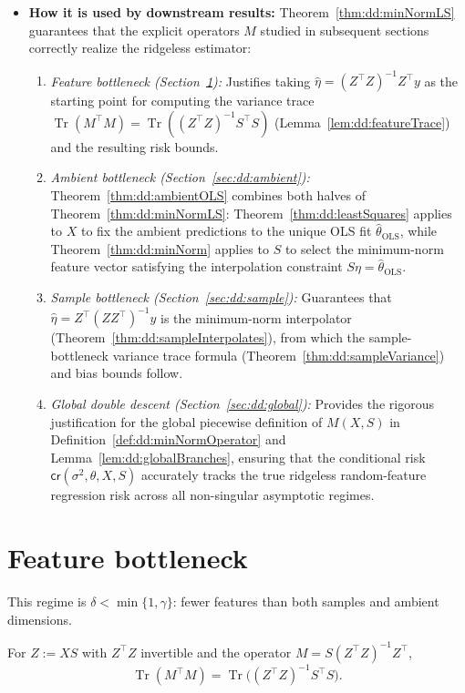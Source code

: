 \begin{remark}
\begin{itemize}
  \item \textbf{How it is used by downstream results:}
  Theorem~\ref{thm:dd:minNormLS} guarantees that the explicit operators $M$ studied in subsequent sections correctly realize the ridgeless estimator:
  \begin{enumerate}
    \item \emph{Feature bottleneck (Section~\ref{sec:dd:feature}):}
    Justifies taking $\hat\eta=(Z^\top Z)^{-1}Z^\top y$ as the starting point for computing the variance trace $\operatorname{Tr}(M^\top M)=\operatorname{Tr}((Z^\top Z)^{-1}S^\top S)$ (Lemma~\ref{lem:dd:featureTrace}) and the resulting risk bounds.
    \item \emph{Ambient bottleneck (Section~\ref{sec:dd:ambient}):}
    Theorem~\ref{thm:dd:ambientOLS} combines both halves of Theorem~\ref{thm:dd:minNormLS}: 
    Theorem~\ref{thm:dd:leastSquares} applies to $X$ to fix the ambient predictions to the unique OLS fit $\hat\theta_{\mathrm{OLS}}$,
     while Theorem~\ref{thm:dd:minNorm} applies to $S$ to select the minimum-norm feature vector satisfying the interpolation constraint $S\eta=\hat\theta_{\mathrm{OLS}}$.
    \item \emph{Sample bottleneck (Section~\ref{sec:dd:sample}):}
    Guarantees that $\hat\eta=Z^\top(ZZ^\top)^{-1}y$ is the minimum-norm interpolator (Theorem~\ref{thm:dd:sampleInterpolates}), from which the sample-bottleneck variance trace formula (Theorem~\ref{thm:dd:sampleVariance}) and bias bounds follow.
    \item \emph{Global double descent (Section~\ref{sec:dd:global}):}
    Provides the rigorous justification for the global piecewise definition of $M(X,S)$ in Definition~\ref{def:dd:minNormOperator} and Lemma~\ref{lem:dd:globalBranches}, 
    ensuring that the conditional risk $\mathsf{cr}(\sigma^2,\theta,X,S)$ accurately tracks the true ridgeless random-feature regression risk across all non-singular asymptotic regimes.
  \end{enumerate}
\end{itemize}
\end{remark}


\section{Feature bottleneck}\label{sec:dd:feature}

This regime is $\delta<\min\{1,\gamma\}$: fewer features than both samples and ambient dimensions.

\begin{lemma}\label{lem:dd:featureTrace}
  \leanok
For $Z:=XS$ with $Z^\top Z$ invertible and the operator $M=S(Z^\top Z)^{-1}Z^\top$,
\[
  \operatorname{Tr}(M^\top M)=\operatorname{Tr}\bigl((Z^\top Z)^{-1}S^\top S\bigr).
\]
\end{lemma}

